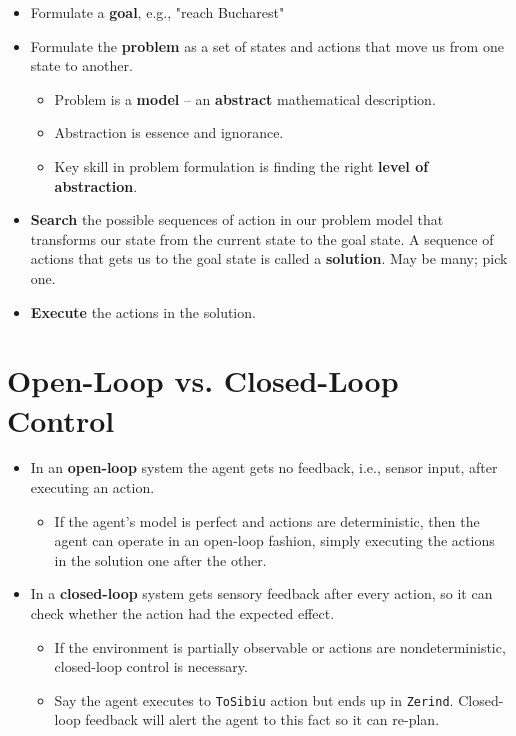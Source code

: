 \documentclass[11pt]{article}
\begin{document}
\begin{itemize}
\item Formulate a \textbf{goal}, e.g., "reach Bucharest"
\item Formulate the \textbf{problem} as a set of states and actions that move us from one state to another.

\begin{itemize}
\item Problem is a \textbf{model} -- an \textbf{abstract} mathematical description.
\item Abstraction is essence and ignorance.
\item Key skill in problem formulation is finding the right \textbf{level of abstraction}.
\end{itemize}

\item \textbf{Search} the possible sequences of action in our problem model that transforms our state from the current state to the goal state.  A sequence of actions that gets us to the goal state is called a \textbf{solution}.  May be many; pick one.
\item \textbf{Execute} the actions in the solution.
\end{itemize}
\section{Open-Loop vs. Closed-Loop Control}
\label{sec:org62f4cef}

\begin{itemize}
\item In an \textbf{open-loop} system the agent gets no feedback, i.e., sensor input, after executing an action.

\begin{itemize}
\item If the agent's model is perfect and actions are deterministic, then the agent can operate in an open-loop fashion, simply executing the actions in the solution one after the other.
\end{itemize}

\item In a \textbf{closed-loop} system gets sensory feedback after every action, so it can check whether the action had the expected effect.

\begin{itemize}
\item If the environment is partially observable or actions are nondeterministic, closed-loop control is necessary.
\item Say the agent executes to \texttt{ToSibiu} action but ends up in \texttt{Zerind}.  Closed-loop feedback will alert the agent to this fact so it can re-plan.
\end{itemize}
\end{itemize}
\end{document}
